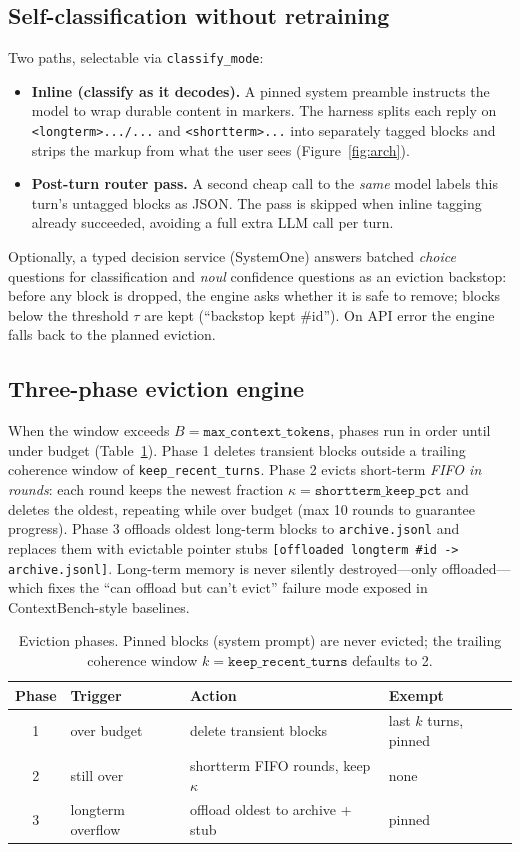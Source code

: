 \documentclass[10pt]{article}
\begin{document}
\subsection{Self-classification without retraining}
Two paths, selectable via \texttt{classify\_mode}:
\begin{itemize}
\item \textbf{Inline (classify as it decodes).} A pinned system preamble instructs the model to wrap durable content in markers. The harness splits each reply on \verb|<longterm>.../...| and \verb|<shortterm>...| into separately tagged blocks and strips the markup from what the user sees (Figure~\ref{fig:arch}).
\item \textbf{Post-turn router pass.} A second cheap call to the \emph{same} model labels this turn's untagged blocks as JSON. The pass is skipped when inline tagging already succeeded, avoiding a full extra LLM call per turn.
\end{itemize}
Optionally, a typed decision service (SystemOne) answers batched \emph{choice} questions for classification and \emph{noul} confidence questions as an eviction backstop: before any block is dropped, the engine asks whether it is safe to remove; blocks below the threshold $\tau$ are kept (``backstop kept \#id''). On API error the engine falls back to the planned eviction.

\subsection{Three-phase eviction engine}
When the window exceeds $B=\texttt{max\_context\_tokens}$, phases run in order until under budget (Table~\ref{tab:phases}). Phase 1 deletes transient blocks outside a trailing coherence window of \texttt{keep\_recent\_turns}. Phase 2 evicts short-term \emph{FIFO in rounds}: each round keeps the newest fraction $\kappa=\texttt{shortterm\_keep\_pct}$ and deletes the oldest, repeating while over budget (max 10 rounds to guarantee progress). Phase 3 offloads oldest long-term blocks to \texttt{archive.jsonl} and replaces them with evictable pointer stubs \verb|[offloaded longterm #id -> archive.jsonl]|. Long-term memory is never silently destroyed---only offloaded---which fixes the ``can offload but can't evict'' failure mode exposed in ContextBench-style baselines.

\begin{table}[h]
\centering\small
\begin{tabular}{clll}
\hline
Phase & Trigger & Action & Exempt\\
\hline
1 & over budget & delete transient blocks & last $k$ turns, pinned\\
2 & still over & shortterm FIFO rounds, keep $\kappa$ & none\\
3 & longterm overflow & offload oldest to archive + stub & pinned\\
\hline
\end{tabular}
\caption{Eviction phases. Pinned blocks (system prompt) are never evicted; the trailing coherence window $k=\texttt{keep\_recent\_turns}$ defaults to 2.}\label{tab:phases}
\end{table}
\end{document}
